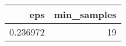 \begin{tabular}{rr}
\toprule
eps & min_samples \\
\midrule
0.236972 & 19 \\
\bottomrule
\end{tabular}

